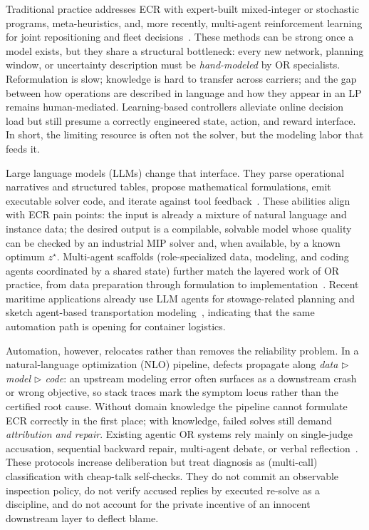 \documentclass[a4paper,fleqn]{cas-sc}
\newcommand{\tri}{\triangleright}
\begin{document}
Traditional practice addresses ECR with expert-built mixed-integer or
stochastic programs, meta-heuristics, and, more recently, multi-agent
reinforcement learning for joint repositioning and fleet
decisions~\citep{poiani2024ecr,cai2025ecrjoint}. These methods can be
strong once a model exists, but they share a structural bottleneck: every
new network, planning window, or uncertainty description must be
\emph{hand-modeled} by OR specialists. Reformulation is slow; knowledge is
hard to transfer across carriers; and the gap between how operations are
described in language and how they appear in an LP remains human-mediated.
Learning-based controllers alleviate online decision load but still
presume a correctly engineered state, action, and reward interface. In
short, the limiting resource is often not the solver, but the modeling
labor that feeds it.

Large language models (LLMs) change that interface. They parse
operational narratives and structured tables, propose mathematical
formulations, emit executable solver code, and iterate against tool
feedback~\citep{xiao2023coe,ahmaditeshnizi2024optimus}. These abilities
align with ECR pain points: the input is already a mixture of natural
language and instance data; the desired output is a compilable,
solvable model whose quality can be checked by an industrial MIP solver
and, when available, by a known optimum $z^{\star}$. Multi-agent
scaffolds (role-specialized data, modeling, and coding agents coordinated
by a shared state) further match the layered work of OR practice, from
data preparation through formulation to
implementation~\citep{wu2024autogen,xiao2023coe,ahmaditeshnizi2024optimus}.
Recent
maritime applications already use LLM agents for stowage-related planning
and sketch agent-based transportation modeling~\citep{liu2025llmtransport},
indicating that the same automation path is opening for container
logistics.

Automation, however, relocates rather than removes the reliability
problem. In a natural-language optimization (NLO) pipeline, defects
propagate along \emph{data $\tri$ model $\tri$ code}: an upstream modeling
error often surfaces as a downstream crash or wrong objective, so stack
traces mark the symptom locus rather than the certified root cause. Without
domain knowledge the pipeline cannot formulate ECR correctly in the first
place; with knowledge, failed solves still demand
\emph{attribution and repair}. Existing agentic OR systems rely mainly on
single-judge accusation, sequential backward repair, multi-agent
debate, or verbal reflection~\citep{du2023improving,shinn2023reflexion,liang2024mad}.
These protocols increase deliberation but treat diagnosis as (multi-call)
classification with cheap-talk self-checks. They do not commit an observable
inspection policy, do not verify accused replies by executed re-solve as a
discipline, and do not account for the private incentive of an innocent
downstream layer to deflect blame.
\end{document}
